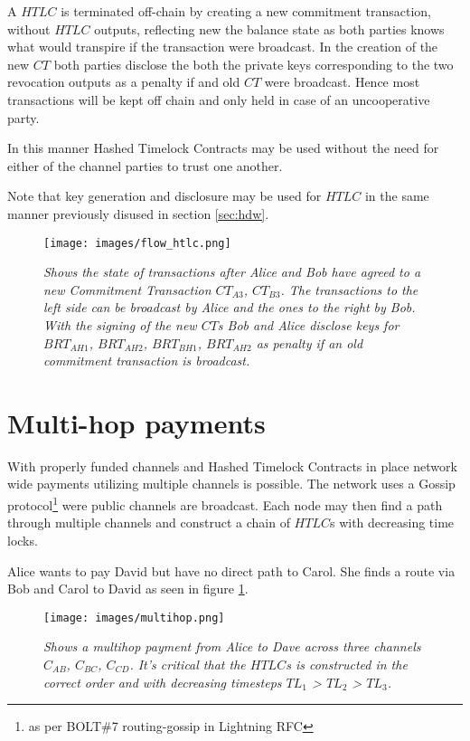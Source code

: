 A $HTLC$ is terminated off-chain by creating a new commitment transaction, without $HTLC$ outputs, reflecting new the balance state as both parties knows what would transpire if the transaction were broadcast. In the creation of the new $CT$ both parties disclose the both the private keys corresponding to the two revocation outputs as a penalty if and old $CT$ were broadcast. Hence most transactions will be kept off chain and only held in case of an uncooperative party.

In this manner Hashed Timelock Contracts may be used without the need for either of the channel parties to trust one another.

Note that key generation and disclosure may be used for $HTLC$ in the same manner previously disused in section \ref{sec:hdw}.

\newpage
\onecolumn

\begin{figure}[!htb]

	\centering
	\texttt{[image: images/flow\_htlc.png]}

	\caption{\textit{
			Shows the state of transactions after Alice and Bob have agreed to a new Commitment Transaction $CT_{A3}$, $CT_{B3}$. 
			The transactions to the left side can be broadcast by Alice and the ones to the right by Bob. With the signing of the new $CT$s
			Bob and Alice disclose keys for $BRT_{AH1}$, $BRT_{AH2}$, $BRT_{BH1}$, $BRT_{AH2}$ as penalty if an old commitment transaction is broadcast.
		}}
\end{figure}
\newpage
\twocolumn

\section{Multi-hop payments} 

With properly funded channels and Hashed Timelock Contracts in place network wide payments utilizing multiple channels is possible.
The network uses a Gossip protocol\footnote{as per BOLT\#7 routing-gossip in Lightning RFC\cite{repository:lightning:rfc}} were
public channels are broadcast. Each node may then find a path through multiple channels and construct a chain of $HTLC$s with decreasing time locks.

Alice wants to pay David but have no direct path to Carol. She finds a route via Bob and Carol to David as seen in figure \ref{fig:multihop}.

\begin{figure}[!htb]

	\centering
	\texttt{[image: images/multihop.png]}

	\caption{\textit{
			Shows a multihop payment from Alice to Dave across three channels $C_{AB}$, $C_{BC}$, $C_{CD}$. It's critical that the $HTLC$s is constructed in the correct order and with decreasing timesteps $TL_{1}$ > $TL_{2}$ > $TL_{3}$.
		}}
	\label{fig:multihop}

\end{figure}

